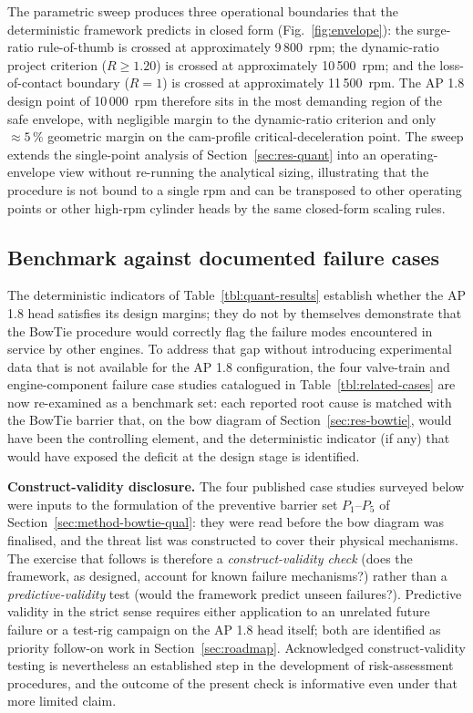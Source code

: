 \noindent The parametric sweep produces three operational
boundaries that the deterministic framework predicts in closed form
(Fig.~\ref{fig:envelope}):
the surge-ratio rule-of-thumb is crossed at approximately
9\,800~rpm; the dynamic-ratio project criterion
($R\geq 1.20$) is crossed at approximately 10\,500~rpm; and the
loss-of-contact boundary ($R=1$) is crossed at approximately
11\,500~rpm. The AP 1.8 design point of 10\,000~rpm therefore sits
in the most demanding region of the safe envelope, with negligible
margin to the dynamic-ratio criterion and only $\approx 5\,\%$
geometric margin on the cam-profile critical-deceleration point. The
sweep extends the single-point analysis of
Section~\ref{sec:res-quant} into an operating-envelope view without
re-running the analytical sizing, illustrating that the procedure is
not bound to a single rpm and can be transposed to other operating
points or other high-rpm cylinder heads by the same closed-form
scaling rules.

\subsection{Benchmark against documented failure cases}
\label{sec:res-litvalidation}

The deterministic indicators of
Table~\ref{tbl:quant-results} establish whether the AP 1.8 head
satisfies its design margins; they do not by themselves demonstrate
that the BowTie procedure would correctly flag the failure modes
encountered in service by other engines. To address that gap without
introducing experimental data that is not available for the AP 1.8
configuration, the four valve-train and engine-component failure
case studies catalogued in Table~\ref{tbl:related-cases} are now
re-examined as a benchmark set: each reported root cause is matched
with the BowTie barrier that, on the bow diagram of
Section~\ref{sec:res-bowtie}, would have been the controlling
element, and the deterministic indicator (if any) that would have
exposed the deficit at the design stage is identified.

\noindent\textbf{Construct-validity disclosure.} The four published
case studies surveyed below were inputs to the formulation of the
preventive barrier set $P_{1}$--$P_{5}$ of
Section~\ref{sec:method-bowtie-qual}: they were read before the bow
diagram was finalised, and the threat list was constructed to cover
their physical mechanisms. The exercise that follows is therefore a
\emph{construct-validity check} (does the framework, as designed,
account for known failure mechanisms?) rather than a
\emph{predictive-validity} test (would the framework predict
unseen failures?). Predictive validity in the strict sense requires
either application to an unrelated future failure or a test-rig
campaign on the AP 1.8 head itself; both are identified as priority
follow-on work in Section~\ref{sec:roadmap}. Acknowledged
construct-validity testing is nevertheless an established step in
the development of risk-assessment procedures, and the outcome of
the present check is informative even under that more limited claim.

